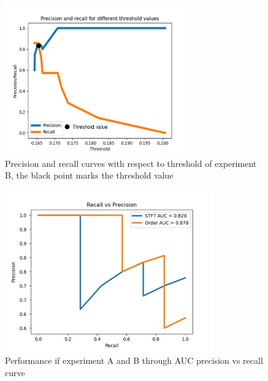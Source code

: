 \documentclass[a4paper, 10pt, twocolumn]{article}
\begin{document}
\begin{figure}[t]
\begin{center}
\includegraphics[width=8cm]{order_threshold_new.png}
\end{center}
\caption{Precision and recall curves with respect to threshold of experiment B, the black point marks the threshold value}
\label{fig:threshold_expb}
\end{figure}
 

\begin{figure}[hbt]
\begin{center}
    

\includegraphics[width=9cm]{auc.png}
\end{center}
\caption{Performance if experiment A and B through AUC precision vs recall curve}
\label{fig:auc_expa_expb}
\end{figure}
    
\end{document}
